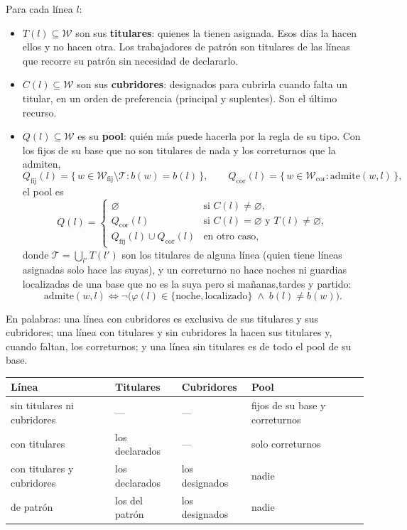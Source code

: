 \documentclass[11pt,a4paper]{article}
\newcommand{\Trab}{\mathcal{W}}
\begin{document}
Para cada línea $l$:
\begin{itemize}[nosep]
  \item $T(l) \subseteq \Trab$ son sus \textbf{titulares}: quienes la tienen asignada. Esos días
        la hacen ellos y no hacen otra. Los trabajadores de patrón son titulares de las líneas
        que recorre su patrón sin necesidad de declararlo.
  \item $C(l) \subseteq \Trab$ son sus \textbf{cubridores}: designados para cubrirla cuando
        falta un titular, en un orden de preferencia (principal y suplentes). Son el último
        recurso.
  \item $Q(l) \subseteq \Trab$ es su \textbf{pool}: quién más puede hacerla por la regla de su
        tipo. Con los fijos de su base que no son titulares de nada y los correturnos que la
        admiten,
        \[
          Q_{\mathrm{fij}}(l) = \{\, w \in \Trab_{\mathrm{fij}} \setminus \mathcal{T} : b(w) = b(l) \,\},
          \qquad
          Q_{\mathrm{cor}}(l) = \{\, w \in \Trab_{\mathrm{cor}} : \mathrm{admite}(w,l) \,\},
        \]
        el pool es
        \[
          Q(l) =
          \begin{cases}
            \varnothing & \text{si } C(l) \neq \varnothing,\\[2pt]
            Q_{\mathrm{cor}}(l) & \text{si } C(l) = \varnothing \text{ y } T(l) \neq \varnothing,\\[2pt]
            Q_{\mathrm{fij}}(l) \cup Q_{\mathrm{cor}}(l) & \text{en otro caso,}
          \end{cases}
        \]
        donde $\mathcal{T} = \bigcup_{l'} T(l')$ son los titulares de alguna línea (quien tiene
        líneas asignadas solo hace las suyas), y un correturno no hace noches ni guardias
        localizadas de una base que no es la suya pero si mañanas,tardes y partido:
        \[
          \mathrm{admite}(w,l) \iff \neg\bigl(\varphi(l) \in \{\text{noche}, \text{localizado}\}
          \;\wedge\; b(l) \neq b(w)\bigr).
        \]
\end{itemize}
En palabras: una línea con cubridores es exclusiva de sus titulares y sus cubridores; una línea
con titulares y sin cubridores la hacen sus titulares y, cuando faltan, los correturnos; y una
línea sin titulares es de todo el pool de su base.

\begin{center}
\begin{tabular}{@{}llll@{}}
  \toprule
  Línea & Titulares & Cubridores & Pool \\
  \midrule
  sin titulares ni cubridores & --- & --- & fijos de su base y correturnos \\
  con titulares & los declarados & --- & solo correturnos \\
  con titulares y cubridores & los declarados & los designados & nadie \\
  de patrón & los del patrón & los designados & nadie \\
  \bottomrule
\end{tabular}
\end{center}
\end{document}
